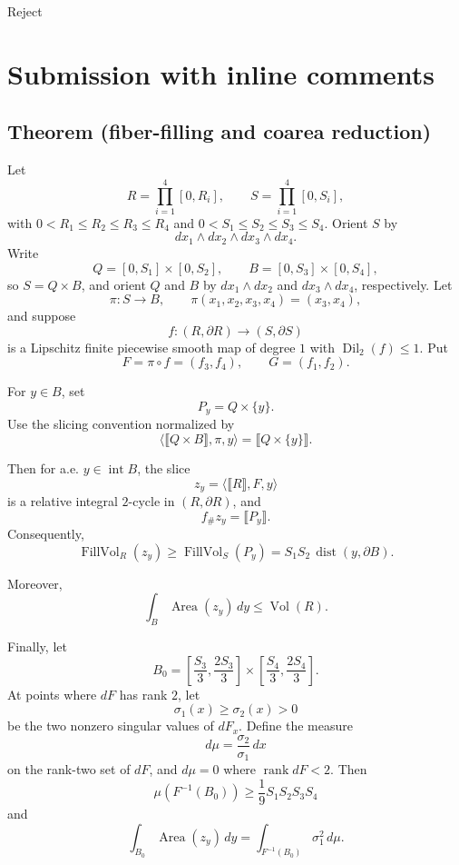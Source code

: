 \documentclass[12pt]{article}
\begin{document}
Reject

  \section{Submission with inline comments}


\date{}


\subsection*{Theorem (fiber-filling and coarea reduction)}

Let
\[
R=\prod_{i=1}^4[0,R_i],\qquad S=\prod_{i=1}^4[0,S_i],
\]
with \(0<R_1\le R_2\le R_3\le R_4\) and \(0<S_1\le S_2\le S_3\le S_4\). Orient \(S\) by
\[
dx_1\wedge dx_2\wedge dx_3\wedge dx_4.
\]
Write
\[
Q=[0,S_1]\times[0,S_2],\qquad B=[0,S_3]\times[0,S_4],
\]
so \(S=Q\times B\), and orient \(Q\) and \(B\) by \(dx_1\wedge dx_2\) and \(dx_3\wedge dx_4\), respectively. Let
\[
\pi:S\to B,\qquad \pi(x_1,x_2,x_3,x_4)=(x_3,x_4),
\]
and suppose
\[
f:(R,\partial R)\to(S,\partial S)
\]
is a Lipschitz finite piecewise smooth map of degree \(1\) with \(\operatorname{Dil}_2(f)\le 1\). Put
\[
F=\pi\circ f=(f_3,f_4),\qquad G=(f_1,f_2).
\]

For \(y\in B\), set
\[
P_y=Q\times\{y\}.
\]
Use the slicing convention normalized by
\[
\langle \llbracket Q\times B\rrbracket,\pi,y\rangle
=
\llbracket Q\times\{y\}\rrbracket .
\]

Then for a.e. \(y\in \operatorname{int}B\), the slice
\[
z_y=\langle \llbracket R\rrbracket,F,y\rangle
\]
is a relative integral \(2\)-cycle in \((R,\partial R)\), and
\[
f_\# z_y=\llbracket P_y\rrbracket .
\]
Consequently,
\[
\operatorname{FillVol}_R(z_y)\ge \operatorname{FillVol}_S(P_y)
=S_1S_2\,\operatorname{dist}(y,\partial B).
\]

Moreover,
\[
\int_B \operatorname{Area}(z_y)\,dy\le \operatorname{Vol}(R).
\]

Finally, let
\[
B_0=\left[\frac{S_3}{3},\frac{2S_3}{3}\right]\times
\left[\frac{S_4}{3},\frac{2S_4}{3}\right].
\]
At points where \(dF\) has rank \(2\), let
\[
\sigma_1(x)\ge \sigma_2(x)>0
\]
be the two nonzero singular values of \(dF_x\). Define the measure
\[
d\mu=\frac{\sigma_2}{\sigma_1}\,dx
\]
on the rank-two set of \(dF\), and \(d\mu=0\) where \(\operatorname{rank}dF<2\). Then
\[
\mu(F^{-1}(B_0))\ge \frac19 S_1S_2S_3S_4
\]
and
\[
\int_{B_0}\operatorname{Area}(z_y)\,dy
=
\int_{F^{-1}(B_0)}\sigma_1^2\,d\mu.
\]
\end{document}
